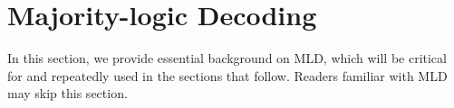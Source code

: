 \documentclass[conference,letterpaper]{IEEEtran}
\begin{document}

\section{Majority-logic Decoding}
In this section, we provide essential background on MLD, which will be critical for and repeatedly used in the sections that follow. Readers familiar with MLD may skip this section.
\end{document}
